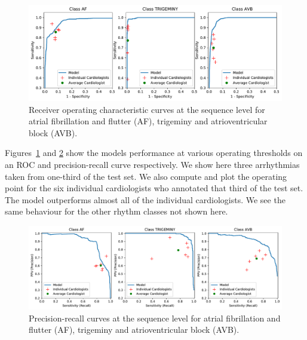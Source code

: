 \begin{figure}
\centering
\includegraphics[width=1.0\textwidth]{arrhythmias/figures/roc_curve.pdf}
\caption{Receiver operating characteristic curves at the sequence level for
    atrial fibrillation and flutter (AF), trigeminy and atrioventricular block
    (AVB).}
\label{fig:arrhythmias:roc_curve}
\end{figure}

Figures~\ref{fig:arrhythmias:roc_curve} and
\ref{fig:arrhythmias:prec_recall_curve} show the models performance at various
operating thresholds on an ROC and precision-recall curve respectively. We show
here three arrhythmias taken from one-third of the test set. We also compute
and plot the operating point for the six individual cardiologists who annotated
that third of the test set. The model outperforms almost all of the individual
cardiologists. We see the same behaviour for the other rhythm classes not shown
here.

\begin{figure}
\centering
\includegraphics[width=1.0\textwidth]{arrhythmias/figures/prec_recall_curve.pdf}
    \caption{Precision-recall curves at the sequence level for atrial
    fibrillation and flutter (AF), trigeminy and atrioventricular block (AVB).}
\label{fig:arrhythmias:prec_recall_curve}
\end{figure}
